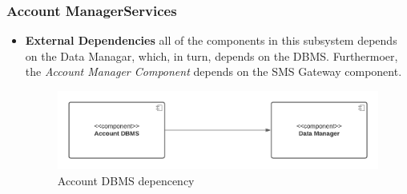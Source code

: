 \subsubsection*{Account ManagerServices}
\begin{itemize}
    \item \textbf{External Dependencies}
    all of the components in this subsystem depends on the Data Managar, which, in turn, depends on the DBMS. Furthermoer, the \textit{Account Manager Component}  depends on the SMS Gateway component.
    \begin{figure}[h!]
        \centering
        \includegraphics[width=.8\textwidth]{Images/TestDiagram/Account/ExternalDependenciesDBMS.png}
        \caption{\label{fig:AccountExternalDepDBMS}{Account DBMS depencency}}
    \end{figure}
    \FloatBarrier  
    

\end{itemize}
